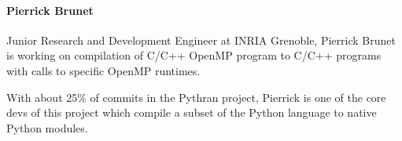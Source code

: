 \paragraph{Pierrick Brunet}


Junior Research and Development Engineer at INRIA Grenoble, Pierrick Brunet
is working on compilation of C/C++ OpenMP program to C/C++ programs with calls
to specific OpenMP runtimes.

With about 25\% of commits in the Pythran project, Pierrick is one of the core
devs of this project which compile a subset of the Python language to native 
Python modules.
